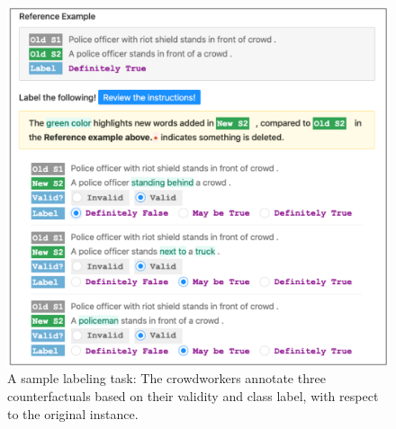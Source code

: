 \begin{figure}[h]
\centering
\includegraphics[width=0.9\columnwidth]{figures/mturk_label}
\vspace{-5pt}
\caption{A sample labeling task: The crowdworkers annotate three counterfactuals based on their validity and class label, with respect to the original instance.}
\vspace{-15pt}
\label{fig:mturk_ui}
\end{figure}




